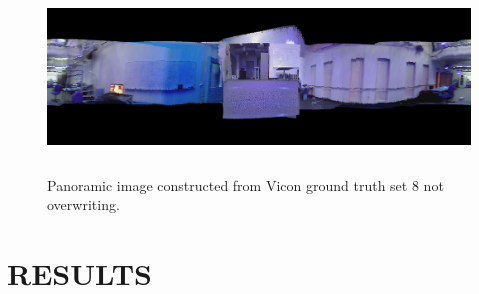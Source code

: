 \documentclass[letterpaper, 10 pt, conference]{ieeeconf}  %
\begin{document}
\begin{figure} [ht]
  \includegraphics[width=\textwidth,height=5cm]{panorama_vicon_8_no_overwrite}
  \caption{Panoramic image constructed from Vicon ground truth set 8 not overwriting.}
  \label{notoverwrite}
\end{figure}


\section{RESULTS}
\end{document}
